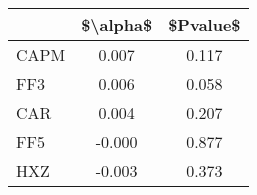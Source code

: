 \begin{tabular}{lcc}
\toprule
{} &  \$\textbackslash alpha\$ &  \$Pvalue\$ \\
\midrule
CAPM &     0.007 &     0.117 \\
FF3  &     0.006 &     0.058 \\
CAR  &     0.004 &     0.207 \\
FF5  &    -0.000 &     0.877 \\
HXZ  &    -0.003 &     0.373 \\
\bottomrule
\end{tabular}
